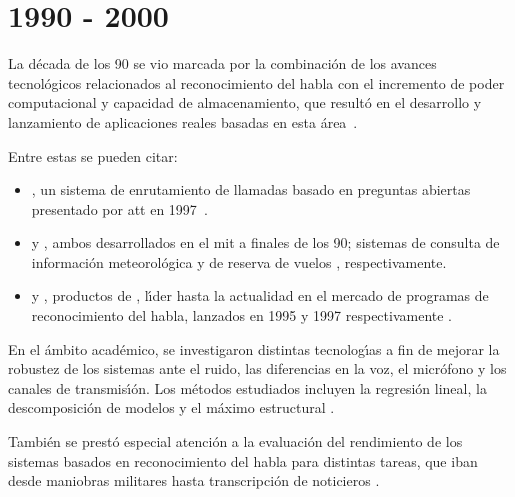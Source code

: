 \section{1990 - 2000}
\label{sec:90s}

La d\'ecada de los 90 se vio marcada por la combinaci\'on de los avances tecnol\'ogicos relacionados al 
reconocimiento del habla con el incremento de poder computacional y capacidad de almacenamiento, 
que result\'o en el desarrollo y
lanzamiento de aplicaciones reales basadas en esta \mbox{\'area \cite{JuangAutomaticSpeech, GauvainLarge2000}}.

Entre estas se pueden citar:
\begin{itemize}
\item {}, un sistema de enrutamiento de llamadas basado en preguntas abiertas 
presentado por \gls{att} en \mbox{1997 \cite{Sachs97howmay}}. 

\item {} y , ambos desarrollados en el \gls{mit} a finales de los 90;
sistemas de consulta de informaci\'on meteorol\'ogica \cite{ZueJupiter2000} y  de reserva de vuelos 
\cite{Seneff2000Dialogue}, respectivamente.

\item {} y , productos de 
, l{\'\i}der hasta la actualidad en el mercado de programas de reconocimiento del 
habla, lanzados en 1995 y 1997 respectivamente \cite{BarnettMultilingual1996, BlandingSpeechless2012}.
\end{itemize}

En el \'ambito acad\'emico, se investigaron distintas tecnolog{\'\i}as a fin de mejorar la robustez de los
sistemas ante el ruido, las diferencias en la voz, el micr\'ofono y los canales de transmis{\'\i}\'on. 
Los m\'etodos estudiados incluyen la regresi\'on lineal, la descomposici\'on de modelos y el m\'aximo
estructural  \cite{AnusuyaSpeech2009}.

Tambi\'en se prest\'o especial atenci\'on a la evaluaci\'on del rendimiento de los sistemas basados en
reconocimiento del habla para distintas tareas, que iban desde maniobras militares hasta transcripci\'on 
de noticieros \cite{JuangAutomaticSpeech}.